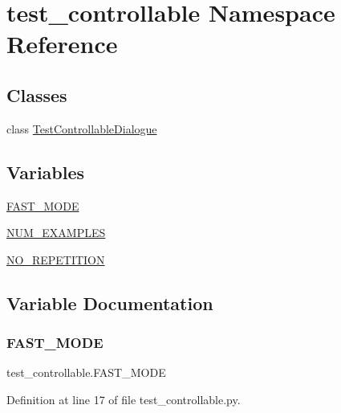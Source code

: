 \hypertarget{namespacetest__controllable}{}\section{test\+\_\+controllable Namespace Reference}
\label{namespacetest__controllable}
\subsection*{Classes}
\begin{DoxyCompactItemize}
\item 
class \hyperlink{classtest__controllable_1_1TestControllableDialogue}{Test\+Controllable\+Dialogue}
\end{DoxyCompactItemize}
\subsection*{Variables}
\begin{DoxyCompactItemize}
\item 
\hyperlink{namespacetest__controllable_a798068090de00d286fafc840978b2d73}{F\+A\+S\+T\+\_\+\+M\+O\+DE}
\item 
\hyperlink{namespacetest__controllable_a6f7fbccca9bcb53081455c73963144b4}{N\+U\+M\+\_\+\+E\+X\+A\+M\+P\+L\+ES}
\item 
\hyperlink{namespacetest__controllable_aa94031443daee69b5e552c5c7dd89417}{N\+O\+\_\+\+R\+E\+P\+E\+T\+I\+T\+I\+ON}
\end{DoxyCompactItemize}


\subsection{Variable Documentation}
\mbox{\label{namespacetest__controllable_a798068090de00d286fafc840978b2d73}} 
\subsubsection{\texorpdfstring{F\+A\+S\+T\+\_\+\+M\+O\+DE}{FAST\_MODE}}
{\footnotesize\ttfamily test\+\_\+controllable.\+F\+A\+S\+T\+\_\+\+M\+O\+DE}



Definition at line 17 of file test\+\_\+controllable.\+py.

